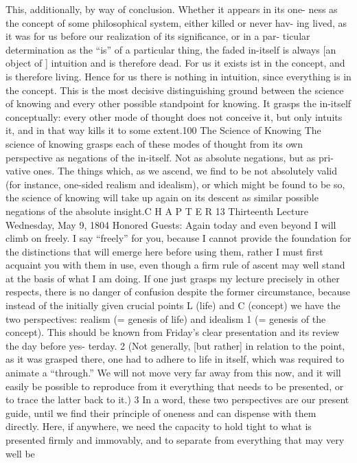 This, additionally, by way of conclusion. Whether it appears in its one-
ness as the concept of some philosophical system, either killed or never hav-
ing lived, as it was for us before our realization of its significance, or in a par-
ticular determination as the “is” of a particular thing, the faded in-itself is
always [an object of ] intuition and is therefore dead. For us it exists {ist} in the
concept, and is therefore living. Hence for us there is nothing in intuition, since
everything is in the concept. This is the most decisive distinguishing ground
between the science of knowing and every other possible standpoint for
knowing. It grasps the in-itself conceptually: every other mode of thought
does not conceive it, but only intuits it, and in that way kills it to some extent.100
The Science of Knowing
The science of knowing grasps each of these modes of thought from its own
perspective as negations of the in-itself. Not as absolute negations, but as pri-
vative ones. The things which, as we ascend, we find to be not absolutely valid
(for instance, one-sided realism and idealism), or which might be found to be
so, the science of knowing will take up again on its descent as similar possible
negations of the absolute insight.C H A P T E R
13
Thirteenth Lecture
Wednesday, May 9, 1804
Honored Guests:
Again today and even beyond I will climb on freely. I say “freely” for you,
because I cannot provide the foundation for the distinctions that will emerge
here before using them, rather I must first acquaint you with them in use, even
though a firm rule of ascent may well stand at the basis of what I am doing.
If one just grasps my lecture precisely in other respects, there is no danger of
confusion despite the former circumstance, because instead of the initially
given crucial points L (life) and C (concept) we have the two perspectives:
realism (= genesis of life) and idealism 1 (= genesis of the concept). This should
be known from Friday’s clear presentation and its review the day before yes-
terday. 2 (Not generally, [but rather] in relation to the point, as it was grasped
there, one had to adhere to life in itself, which was required to animate a
“through.” We will not move very far away from this now, and it will easily be
possible to reproduce from it everything that needs to be presented, or to trace
the latter back to it.) 3 In a word, these two perspectives are our present guide,
until we find their principle of oneness and can dispense with them directly.
Here, if anywhere, we need the capacity to hold tight to what is presented
firmly and immovably, and to separate from everything that may very well be
